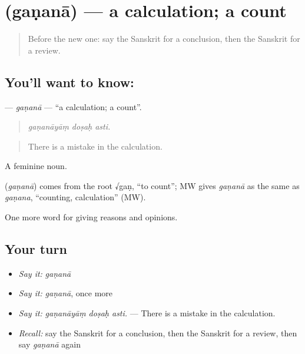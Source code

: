 \section[\texorpdfstring{\sk{गणना} (gaṇanā)}{गणना (gaṇanā)}]{ (gaṇanā) — a calculation; a count}

\label{lesson:SA-C366-ganana}



\begin{quote}
Before the new one: say the Sanskrit for a conclusion, then the Sanskrit for a review.
\end{quote}

\subsection*{You'll want to know: }
\textbf{} — \emph{gaṇanā} — \textquotedblleft{}a calculation; a count\textquotedblright{}.

\begin{quote}
  
\end{quote}

\begin{quote}
\emph{gaṇanāyāṃ doṣaḥ asti.}
\end{quote}

\begin{quote}
There is a mistake in the calculation.
\end{quote}

A feminine noun.

\begin{cousinweb}
\textbf{} (\emph{gaṇanā}) comes from the root √gaṇ, \textquotedblleft{}to count\textquotedblright{}; MW gives \emph{gaṇanā} as the same as \emph{gaṇana}, \textquotedblleft{}counting, calculation\textquotedblright{} (MW).
\end{cousinweb}

\begin{grammarlens}[title={What you've built}]
One more word for giving reasons and opinions.
\end{grammarlens}

\subsection*{Your turn}
\begin{itemize}
\raggedright
  \item \emph{Say it:} \emph{gaṇanā}
  \item \emph{Say it:} \emph{gaṇanā}, once more
  \item \emph{Say it:} \emph{gaṇanāyāṃ doṣaḥ asti.} — There is a mistake in the calculation.
  \item \emph{Recall:} say the Sanskrit for a conclusion, then the Sanskrit for a review, then say \emph{gaṇanā} again
\end{itemize}

